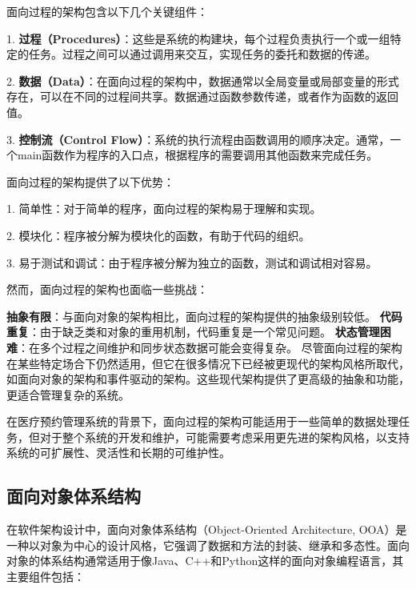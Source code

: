 面向过程的架构包含以下几个关键组件：

1. \textbf{过程（Procedures）}：这些是系统的构建块，每个过程负责执行一个或一组特定的任务。过程之间可以通过调用来交互，实现任务的委托和数据的传递。

2. \textbf{数据（Data）}：在面向过程的架构中，数据通常以全局变量或局部变量的形式存在，可以在不同的过程间共享。数据通过函数参数传递，或者作为函数的返回值。

3. \textbf{控制流（Control Flow）}：系统的执行流程由函数调用的顺序决定。通常，一个main函数作为程序的入口点，根据程序的需要调用其他函数来完成任务。

面向过程的架构提供了以下优势：

1. 简单性：对于简单的程序，面向过程的架构易于理解和实现。

2. 模块化：程序被分解为模块化的函数，有助于代码的组织。

3. 易于测试和调试：由于程序被分解为独立的函数，测试和调试相对容易。

然而，面向过程的架构也面临一些挑战：

\textbf{抽象有限}：与面向对象的架构相比，面向过程的架构提供的抽象级别较低。
\textbf{代码重复}：由于缺乏类和对象的重用机制，代码重复是一个常见问题。
\textbf{状态管理困难}：在多个过程之间维护和同步状态数据可能会变得复杂。
尽管面向过程的架构在某些特定场合下仍然适用，但它在很多情况下已经被更现代的架构风格所取代，如面向对象的架构和事件驱动的架构。这些现代架构提供了更高级的抽象和功能，更适合管理复杂的系统。

在医疗预约管理系统的背景下，面向过程的架构可能适用于一些简单的数据处理任务，但对于整个系统的开发和维护，可能需要考虑采用更先进的架构风格，以支持系统的可扩展性、灵活性和长期的可维护性。

\subsection{面向对象体系结构}
在软件架构设计中，面向对象体系结构（Object-Oriented Architecture, OOA）是一种以对象为中心的设计风格，它强调了数据和方法的封装、继承和多态性。面向对象的体系结构通常适用于像Java、C++和Python这样的面向对象编程语言，其主要组件包括：

